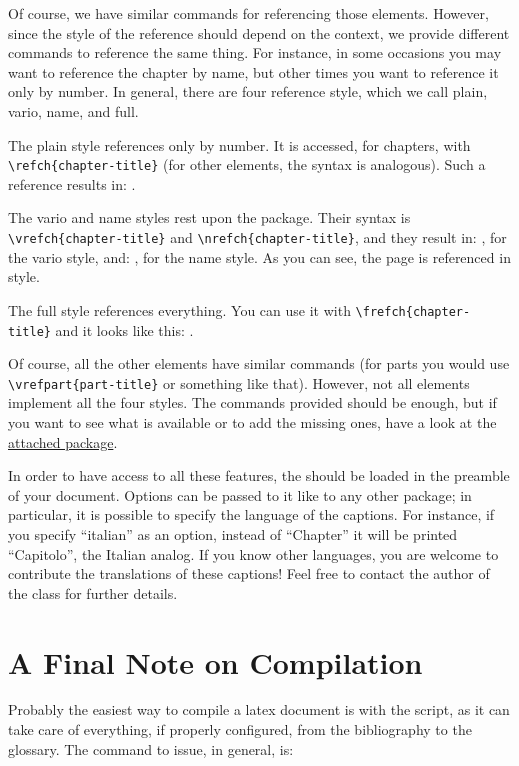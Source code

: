 Of course, we have similar commands for referencing those elements. 
However, since the style of the reference should depend on the context, 
we provide different commands to reference the same thing. For instance, 
in some occasions you may want to reference the chapter by name, but 
other times you want to reference it only by number. In general, there 
are four reference style, which we call plain, vario, name, and full.

The plain style references only by number. It is accessed, for chapters, 
with \lstinline|\refch{chapter-title}| (for other elements, the syntax 
is analogous). Such a reference results in: .

The vario and name styles rest upon the  package. 
Their syntax is \lstinline|\vrefch{chapter-title}| and 
\lstinline|\nrefch{chapter-title}|, and they result in: 
, for the vario style, and: , for 
the name style. As you can see, the page is referenced in 
 style.

The full style references everything. You can use it with 
\lstinline|\frefch{chapter-title}| and it looks like this: 
.

Of course, all the other elements have similar commands (\eg for parts 
you would use \lstinline|\vrefpart{part-title}| or something like that). 
However, not all elements implement all the four styles. The commands 
provided should be enough, but if you want to see what is available or 
to add the missing ones, have a look at the 
\href{styles/kaorefs.sty}{attached package}.

In order to have access to all these features, the  
should be loaded in the preamble of your document. Options can be passed 
to it like to any other package; in particular, it is possible to 
specify the language of the captions. For instance, if you specify 
\enquote{italian} as an option, instead of \enquote{Chapter} it will be 
printed \enquote{Capitolo}, the Italian analog. If you know other 
languages, you are welcome to contribute the translations of these 
captions! Feel free to contact the author of the class for further 
details.

\section{A Final Note on Compilation}

Probably the easiest way to compile a latex document is with the 
 script, as it can take care of everything, if properly 
configured, from the bibliography to the glossary. The command to issue, 
in general, is:

